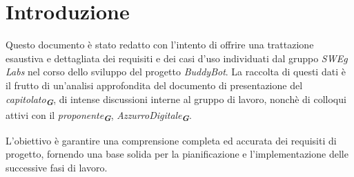 

\section{Introduzione}
\label{sec:introduzione}

Questo documento è stato redatto con l'intento di offrire una trattazione esaustiva e dettagliata 
dei requisiti e dei casi d'uso individuati dal gruppo \emph{SWEg Labs} nel corso dello sviluppo
del progetto \emph{BuddyBot}. La raccolta di questi dati è il frutto di un'analisi approfondita
del documento di presentazione del \emph{capitolato}\textsubscript{\textit{\textbf{G}}}, di intense discussioni interne al gruppo di lavoro, 
nonchè di colloqui attivi con il \emph{proponente}\textsubscript{\textit{\textbf{G}}}, \emph{AzzurroDigitale}\textsubscript{\textit{\textbf{G}}}.

L'obiettivo è garantire una comprensione completa ed accurata dei requisiti di progetto,
fornendo una base solida per la pianificazione e l'implementazione delle successive fasi di lavoro.

